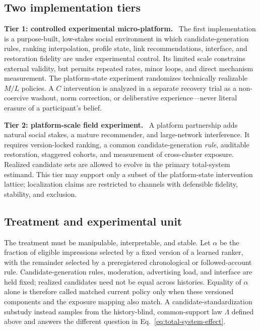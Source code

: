 \documentclass[10pt,a4paper]{article}
\newcommand{\inlinehead}[1]{\par\smallskip\noindent\textbf{#1}\ }
\begin{document}
\subsection{Two implementation tiers}

\inlinehead{Tier 1: controlled experimental micro-platform.} The first implementation is a purpose-built, low-stakes social environment in which candidate-generation rules, ranking interpolation, profile state, link recommendations, interface, and restoration fidelity are under experimental control. Its limited scale constrains external validity, but permits repeated rates, minor loops, and direct mechanism measurement. The platform-state experiment randomizes technically realizable $M/L$ policies. A $C$ intervention is analyzed in a separate recovery trial as a non-coercive washout, norm correction, or deliberative experience---never literal erasure of a participant's belief.

\inlinehead{Tier 2: platform-scale field experiment.} A platform partnership adds natural social stakes, a mature recommender, and large-network interference. It requires version-locked ranking, a common candidate-generation \emph{rule}, auditable restoration, staggered cohorts, and measurement of cross-cluster exposure. Realized candidate sets are allowed to evolve in the primary total-system estimand. This tier may support only a subset of the platform-state intervention lattice; localization claims are restricted to channels with defensible fidelity, stability, and exclusion.

\subsection{Treatment and experimental unit}

The treatment must be manipulable, interpretable, and stable. Let $\alpha$ be the fraction of eligible impressions selected by a fixed version of a learned ranker, with the remainder selected by a preregistered chronological or followed-account rule. Candidate-generation rules, moderation, advertising load, and interface are held fixed; realized candidates need not be equal across histories. Equality of $\alpha$ alone is therefore called matched current policy only when these versioned components and the exposure mapping also match. A candidate-standardization substudy instead samples from the history-blind, common-support law $\Lambda$ defined above and answers the different question in Eq.~\eqref{eq:total-system-effect}.
\end{document}
